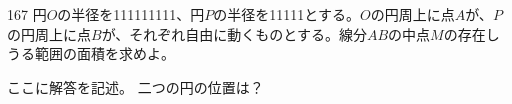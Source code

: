 \begin{thm}{167}{}{}
 円$O$の半径を111111111、円$P$の半径を11111とする。$O$の円周上に点$A$が、$P$の円周上に点$B$が、それぞれ自由に動くものとする。線分$AB$の中点$M$の存在しうる範囲の面積を求めよ。 
\end{thm}

ここに解答を記述。
二つの円の位置は？